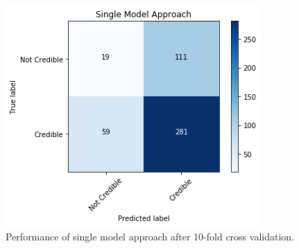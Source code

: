 \documentclass[a4paper,twoside,phd]{BYUPhys}
\begin{document}
\begin{table}[H]
	\centering
	\caption{Performance of low credibility identification task via an ensemble approach.}
	\label{table:SingleModelApproach}
\end{table}

\begin{figure}[H]
	\centering
	\includegraphics[totalheight=7cm]{images/single-model-performance.png}
	\caption{Performance of single model approach after 10-fold cross validation.}
	\label{fig:SingleModelPerformance}
\end{figure}
\end{document}
